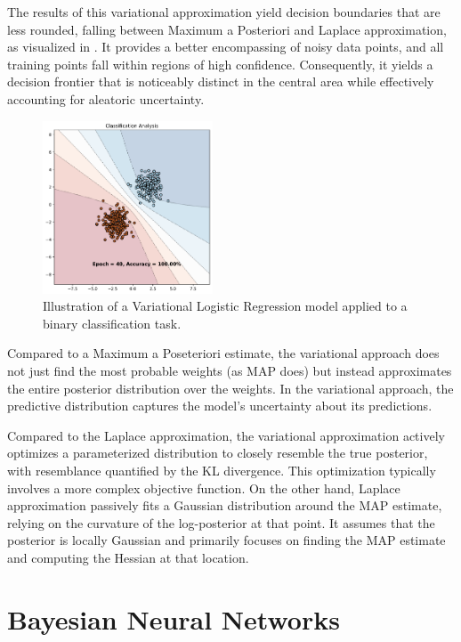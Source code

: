 The results of this variational approximation yield decision boundaries that are less rounded, falling between Maximum a Posteriori and Laplace approximation, as visualized in . It provides a better encompassing of noisy data points, and all training points fall within regions of high confidence. Consequently, it yields a decision frontier that is noticeably distinct in the central area while effectively accounting for aleatoric uncertainty.

\begin{figure}[H]
    \centering
    \includegraphics[width=0.45\textwidth]{logreg_variational.pdf}
    \caption{Illustration of a Variational Logistic Regression model applied to a binary classification task.}
    \label{fig:logreg_variational}
\end{figure}

Compared to a Maximum a Poseteriori estimate, the variational approach does not just find the most probable weights (as MAP does) but instead approximates the entire posterior distribution over the weights. In the variational approach, the predictive distribution captures the model's uncertainty about its predictions.

Compared to the Laplace approximation, the variational approximation actively optimizes a parameterized distribution to closely resemble the true posterior, with resemblance quantified by the KL divergence. This optimization typically involves a more complex objective function. On the other hand, Laplace approximation passively fits a Gaussian distribution around the MAP estimate, relying on the curvature of the log-posterior at that point. It assumes that the posterior is locally Gaussian and primarily focuses on finding the MAP estimate and computing the Hessian at that location.

\section{Bayesian Neural Networks}

